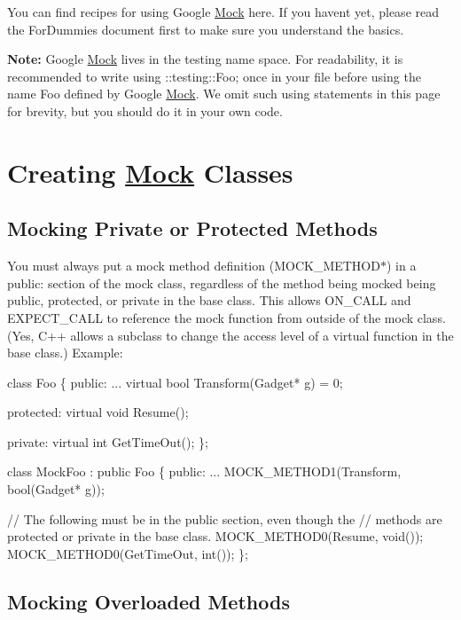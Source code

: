 You can find recipes for using Google \hyperlink{class_mock}{Mock} here. If you haven\textquotesingle{}t yet, please read the For\+Dummies document first to make sure you understand the basics.

{\bfseries Note\+:} Google \hyperlink{class_mock}{Mock} lives in the {\ttfamily testing} name space. For readability, it is recommended to write {\ttfamily using \+::testing\+::\+Foo;} once in your file before using the name {\ttfamily Foo} defined by Google \hyperlink{class_mock}{Mock}. We omit such {\ttfamily using} statements in this page for brevity, but you should do it in your own code.

\section*{Creating \hyperlink{class_mock}{Mock} Classes}

\subsection*{Mocking Private or Protected Methods}

You must always put a mock method definition ({\ttfamily M\+O\+C\+K\+\_\+\+M\+E\+T\+H\+O\+D$\ast$}) in a {\ttfamily public\+:} section of the mock class, regardless of the method being mocked being {\ttfamily public}, {\ttfamily protected}, or {\ttfamily private} in the base class. This allows {\ttfamily O\+N\+\_\+\+C\+A\+LL} and {\ttfamily E\+X\+P\+E\+C\+T\+\_\+\+C\+A\+LL} to reference the mock function from outside of the mock class. (Yes, C++ allows a subclass to change the access level of a virtual function in the base class.) Example\+:


\begin{DoxyCode}
class Foo \{
 public:
  ...
  virtual bool Transform(Gadget* g) = 0;

 protected:
  virtual void Resume();

 private:
  virtual int GetTimeOut();
\};

class MockFoo : public Foo \{
 public:
  ...
  MOCK\_METHOD1(Transform, bool(Gadget* g));

  // The following must be in the public section, even though the
  // methods are protected or private in the base class.
  MOCK\_METHOD0(Resume, void());
  MOCK\_METHOD0(GetTimeOut, int());
\};
\end{DoxyCode}


\subsection*{Mocking Overloaded Methods}

